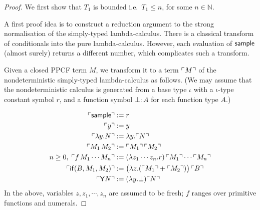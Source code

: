 \begin{proof}
We first show that $T_1$ is bounded i.e.~$T_1 \leq n$, for some $n \in \mathbb N$.

A first proof idea is to construct a reduction argument to the strong normalisation of the simply-typed lambda-calculus.
 There is a classical transform of conditionals into the pure lambda-calculus.
However, each evaluation of $\tsample$ (almost surely) returns a different number, which complicates such a transform.

Given a closed PPCF term $M$, we transform it to a term ${\ulcorner{M}\urcorner}$ of the nondeterministic simply-typed lambda-calculus as follows.
(We may assume that the nondeterministic calculus is generated from a base type $\iota$ with a $\iota$-type constant symbol $r$, and a function symbol $\bot : A$  for each function type $A$.)
\iffalse
\begin{enumerate}
\item replace every $\tsample$ by $r$ 

\item replace each base-type subterm $f \, M_1 \cdots M_n$ by $(\lambda x_1 \cdots x_n . r) \, \transform{M_1} \cdots \transform{M_n}$ where $f$ is a primitive function

\item replace every subterm $\tif{B}{M_1}{M_2}$ by
$(\lambda x . \transform{M_1} + \transform{M_2}) \, \transform{B}$, for a fresh $x$

\item replace every $\tY \, f \, x . N$ by $\lambda x . \transform{N}[\bot / f]$
\end{enumerate}
\lo{The above rules can be defined formally.}
\fi
\begin{align*}
{\ulcorner{\mathsf{sample}}\urcorner} &:= r\\
{\ulcorner{y}\urcorner} &:= y \\
{\ulcorner{\lambda y . N}\urcorner} &:= \lambda y . {\ulcorner{N}\urcorner}\\
{\ulcorner{M_1 \, M_2}\urcorner} &:= {\ulcorner{M_1}\urcorner} \, {\ulcorner{M_2}\urcorner} \\
n \geq 0, \; {\ulcorner{f \, M_1 \cdots M_n}\urcorner} &:= (\lambda z_1 \cdots z_n . r) \, {\ulcorner{M_1}\urcorner} \cdots {\ulcorner{M_n}\urcorner} \\
{\ulcorner{\mathsf{if}(B, M_1, M_2)}\urcorner} &:= \big(\lambda z . ({\ulcorner{M_1}\urcorner} + {\ulcorner{M_2}\urcorner})\big) \, {\ulcorner{B}\urcorner} \\
{\ulcorner{\mathsf{Y}N}\urcorner} &:= (\lambda y . \bot) {\ulcorner{N}\urcorner}
\end{align*}
In the above, variables $z, z_1, \cdots, z_n$ are assumed to be fresh; $f$ ranges over primitive functions and numerals.


\end{proof}
